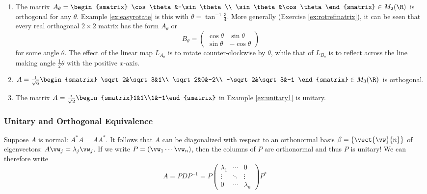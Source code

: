 \begin{examples}[label=exes:orthomatrix]
\begin{enumerate}
  \item\label{ex:rotref} The matrix $A_\theta=\begin{smatrix}
	\cos\theta&-\sin\theta\\
	\sin\theta&\cos\theta
  \end{smatrix}\in M_2(\R)$ is orthogonal for any $\theta$. Example \ref{ex:easyrotate} is this with $\theta=\tan^{-1}\frac 34$. More generally (Exercise \ref{ex:rotrefmatrix}), it can be seen that every real orthogonal $2\times 2$ matrix has the form $A_\theta$ or 
	\[B_\theta=\begin{pmatrix}
	\cos\theta&\sin\theta\\
	\sin\theta&-\cos\theta
	\end{pmatrix}\]
	for some angle $\theta$. The effect of the linear map $L_{A_\theta}$ is to rotate counter-clockwise by $\theta$, while that of $L_{B_\theta}$ is to reflect across the line making angle $\frac 12\theta$ with the positive $x$-axis.
	
	\item $A=\frac 1{\sqrt 6}\begin{smatrix}
	\sqrt 2&\sqrt 3&1\\
	\sqrt 2&0&-2\\
	-\sqrt 2&\sqrt 3&-1
	\end{smatrix}\in M_3(\R)$ is orthogonal.
	
	\item The matrix $A=\frac i{\sqrt 2}\begin{smatrix}1&1\\1&-1\end{smatrix}$ in Example \ref{ex:unitary1} is unitary.
\end{enumerate}
\end{examples}


\subsubsection*{Unitary and Orthogonal Equivalence}

Suppose $A$ is normal: $A^*A=AA^*$. It follows that $A$ can be diagonalized with respect to an orthonormal basis $\beta=\{\vect{\vw}{n}\}$ of eigenvectors: $A\vw_j=\lambda_j\vw_j$. If we write $P=(\vw_1\cdots \vw_n)$, then the columns of $P$ are orthonormal and thus $P$ is unitary! We can therefore write
\[A=PDP^{-1}=P\begin{pmatrix}
\lambda_1&\cdots&0\\
\vdots&\ddots&\vdots\\
0&\cdots&\lambda_n
\end{pmatrix}P^*\]

